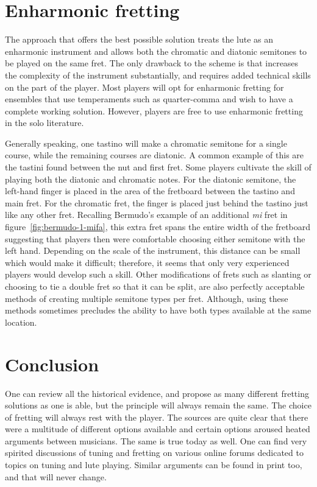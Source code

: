 \section{Enharmonic fretting}

The approach that offers the best possible solution treats the lute as an enharmonic
instrument and allows both the chromatic and diatonic semitones to be played on the
same fret. The only drawback to the scheme is that increases the complexity of the
instrument substantially, and requires added technical skills on the part of the
player. Most players will opt for enharmonic fretting for ensembles that use
temperaments such as quarter-comma and wish to have a complete working solution.
However, players are free to use enharmonic fretting in the solo literature.

Generally speaking, one tastino will make a chromatic semitone for a single course,
while the remaining courses are diatonic.  A common example of this are the tastini
found between the nut and first fret.  Some players cultivate the skill of playing both
the diatonic and chromatic notes.  For the diatonic semitone, the left-hand finger is
placed in the area of the fretboard between the tastino and main fret.  For the
chromatic fret, the finger is placed just behind the tastino just like any other fret.
Recalling Bermudo's example of an additional \textit{mi} fret in
figure~\ref{fig:bermudo-1-mifa}, this extra fret spans the entire width of the
fretboard suggesting that players then were comfortable choosing either semitone with
the left hand.  Depending on the scale of the instrument, this distance can be small
which would make it difficult; therefore, it seems that only very experienced players
would develop such a skill. Other modifications of frets such as slanting or choosing
to tie a double fret so that it can be split, are also perfectly acceptable methods of
creating multiple semitone types per fret. Although, using these methods sometimes
precludes the ability to have both types available at the same location.

\section{Conclusion}

One can review all the historical evidence, and propose as many different fretting
solutions as one is able, but the principle will always remain the same. The choice
of fretting will always rest with the player. The sources are quite clear that there
were a multitude of different options available and certain options aroused heated
arguments between musicians. The same is true today as well. One can find very
spirited discussions of tuning and fretting on various online forums dedicated to
topics on tuning and lute playing. Similar arguments can be found in print too, and
that will never change. \autocite{DD:4}

